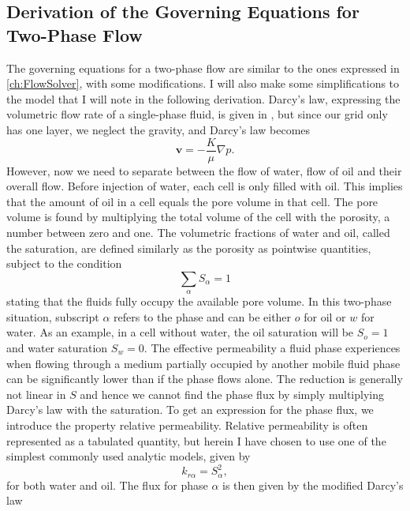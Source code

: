 \subsection{Derivation of the Governing Equations for Two-Phase Flow}
The governing equations for a two-phase flow are similar to the ones expressed in \autoref{ch:FlowSolver}, with some modifications. I will also make some simplifications to the model that I will note in the following derivation. Darcy's law, expressing the volumetric flow rate of a single-phase fluid, is given in , but since our grid only has one layer, we neglect the gravity, and Darcy's law becomes
\begin{equation*}
    \textbf{v} = - \frac{K}{\mu}\nabla p.
    \label{eq:DarcyNoGravity}
\end{equation*}
However, now we need to separate between the flow of water, flow of oil and their overall flow. Before injection of water, each cell is only filled with oil. This implies that the amount of oil in a cell equals the pore volume in that cell. The pore volume is found by multiplying the total volume of the cell with the porosity, a number between zero and one. The volumetric fractions of water and oil, called the saturation, are defined similarly as the porosity as pointwise quantities, subject to the condition
\begin{equation*}
\sum_\alpha S_\alpha = 1
\end{equation*}
stating that the fluids fully occupy the available pore volume. In this two-phase situation, subscript $\alpha$ refers to the phase and can be either $o$ for oil or $w$ for water. As an example, in a cell without water, the oil saturation will be $S_o = 1$ and water saturation $S_w = 0$.  The effective permeability a fluid phase experiences when flowing through a medium partially occupied by another mobile fluid phase can be significantly lower than if the phase flows alone. The reduction is generally not linear in $S$ and hence we cannot find the phase flux by simply multiplying Darcy's law with the saturation. To get an expression for the phase flux, we introduce the property relative permeability. Relative permeability is often represented as a tabulated quantity, but herein I have chosen to use one of the simplest commonly used analytic models, given by
\begin{equation*}
k_{r\alpha} = S_\alpha^2,
\end{equation*}
for both water and oil. The flux for phase $\alpha$ is then given by the modified Darcy's law
